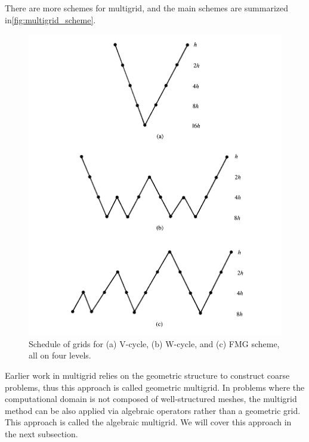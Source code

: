 There are more schemes for multigrid, and the main schemes are summarized in\autoref{fig:multigrid_scheme}.
\begin{figure}
    \centering
    \includegraphics[width=\linewidth]{figures/multigrid_scheme.png}
    \caption{Schedule of grids for (a) V-cycle, (b) W-cycle, and (c) FMG scheme,
all on four levels. \cite{briggs2000multigrid}}
    \label{fig:multigrid_scheme}
\end{figure}

Earlier work in multigrid relies on the geometric structure to construct coarse problems, thus this approach is called geometric multigrid.  In problems where the computational domain is not composed of well-structured meshes, the multigrid method can be also applied via algebraic operators rather than a geometric grid.  This approach is called the algebraic multigrid. We will cover this approach in the next subsection.

